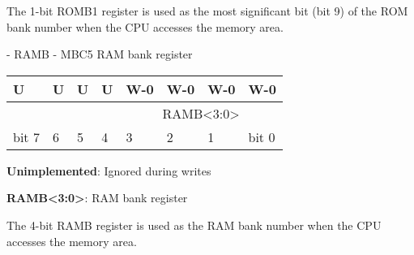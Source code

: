 \documentclass[\main/gbctr.tex]{subfiles}
\begin{document}
The 1-bit ROMB1 register is used as the most significant bit (bit 9) of the ROM
bank number when the CPU accesses the  memory area.

\begin{register}[H]
  \caption{ - RAMB - MBC5 RAM bank register}

  {
    \ttfamily
    \begin{tabularx}{\linewidth}{|X|X|X|X|X|X|X|X|}
      \hline
      U & U & U & U & W-0 & W-0 & W-0 & W-0 \\
      \hline
      \cellcolor{LightGray} & \cellcolor{LightGray} & \cellcolor{LightGray} & \cellcolor{LightGray} & \multicolumn{4}{c|}{RAMB<3:0>} \\
      \hline
      bit 7 & 6 & 5 & 4 & 3 & 2 & 1 & bit 0 \\
      \hline
    \end{tabularx}{\parfillskip=0pt\par}
  }

  \begin{description}[leftmargin=5em, style=nextline]
    \item[bit 7-4]
      \textbf{Unimplemented}: Ignored during writes
    \item[bit 3-0]
      \textbf{RAMB<3:0>}: RAM bank register
  \end{description}
\end{register}

The 4-bit RAMB register is used as the RAM bank number when the CPU accesses
the  memory area.
\end{document}
